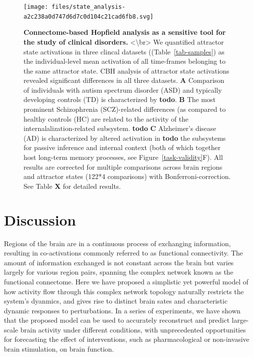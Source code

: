 \documentclass{article}
\begin{document}
\begin{figure}[!htbp]
\centering
\texttt{[image: files/state\_analysis-a2c238a0d747d6d7c0d104c21cad6fb8.svg]}
\caption[]{\textbf{Connectome-based Hopfield analysis as a sensitive tool for the study of clinical disorders.} \newline
\textless {\textbackslash}br\textgreater 
We quantified attractor state activations in three clincal datasets ((Table~\ref{tab-samples}) as the individual-level mean activation of all time-frames belonging to the same attractor state.
CBH analysis of attractor state activations revealed significant differences in all three datasets.
\textbf{A} Comparison of individuals with autism spectrum disorder (ASD) and typically developing controls (TD) is characterized by \textbf{todo}.
\textbf{B} The most prominent Schizophrenia (SCZ)-related differences (as compared to healthy controls (HC) are related to the activity of the internalalization-related subsystem. \textbf{todo}
\textbf{C} Alzheimer's disease (AD) is characterized by altered activation in \textbf{todo} the subsystems for passive inference and internal context (both of which together host long-term memory processes, see Figure~\ref{task-validity}F). All results are corrected for multiple comparisons across brain regions and attractor states (122*4 comparisons) with Bonferroni-correction. See Table \textbf{X} for detailed results.}
\label{clinical-validity}
\end{figure}

\section{Discussion}\label{Discussion}

Regions of the brain are in a continuous process of exchanging information, resulting in co-activations commonly referred to as functional connectivity.
The amount of information exchanged is not constant across the brain but varies largely for various region pairs, spanning the complex network known as the functional connectome.
Here we have proposed a simplistic yet powerful model of how activity flow through this complex network topology naturally restricts the system's dyanmics, and gives rise to distinct brain sates and characteristic dynamic responses to perturbations.
In a series of experiments, we have shown that the proposed model can be used to accurately reconstruct and predict large-scale brain activity under different conditions, with unprecedented opportunities for forecasting the effect of interventions, such as pharmacological or non-invasive brain stimulation, on brain function.
\end{document}
